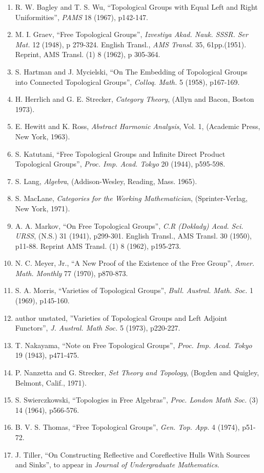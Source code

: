 \documentclass{article}
\begin{document}
\begin{enumerate}[1.]
  \item R. W. Bagley and T. S. Wu, ``Topological Groups with Equal Left and Right Uniformities'', \emph{PAMS} 18 (1967), p142-147.
  \item M. I. Graev, ``Free Topological Groups'', \emph{Izvestiya Akad. Nauk. SSSR. Ser Mat.} 12 (1948), p 279-324. English Transl., \emph{AMS Transl.} 35, 61pp.(1951). Reprint, AMS Transl. (1) 8 (1962), p 305-364.
  \item S. Hartman and J. Mycielski, ``On The Embedding of Topological Groups into Connected Topological Groups'', \emph{Colloq. Math.} 5 (1958), p167-169.
  \item H. Herrlich and G. E. Strecker, \emph{Category Theory}, (Allyn and Bacon, Boston 1973).
  \item E. Hewitt and K. Ross, \emph{Abstract Harmonic Analysis}, Vol. 1, (Academic Press, New York, 1963).
  \item S. Katutani, ``Free Topological Groups and Infinite Direct Product Topological Groups'', \emph{Proc. Imp. Acad. Tokyo} 20 (1944), p595-598.
  \item S. Lang, \emph{Algebra}, (Addison-Wesley, Reading, Mass. 1965).
  \item S. MacLane, \emph{Categories for the Working Mathematician}, (Sprinter-Verlag, New York, 1971).
  \item A. A. Markov, ``On Free Topological Groups'', \emph{C.R (Doklady) Acad. Sci. URSS}, (N.S.) 31 (1941), p299-301. English Transl., AMS Transl. 30 (1950), p11-88. Reprint AMS Transl. (1) 8 (1962), p195-273.
  \item N. C. Meyer, Jr., ``A New Proof of the Existence of the Free Group'', \emph{Amer. Math. Monthly} 77 (1970), p870-873.
  \item S. A. Morris, ``Varieties of Topological Groups'', \emph{Bull. Austral. Math. Soc.} 1 (1969), p145-160.
  \item author unstated, ''Varieties of Topological Groups and Left Adjoint Functors'', \emph{J. Austral. Math Soc.} 5 (1973), p220-227.
  \item T. Nakayama, ``Note on Free Topological Groups'', \emph{Proc. Imp. Acad. Tokyo} 19 (1943), p471-475.
  \item P. Nanzetta and G. Strecker, \emph{Set Theory and Topology}, (Bogden and Quigley, Belmont, Calif., 1971).
  \item S. Swierczkowski, ``Topologies in Free Algebras'', \emph{Proc. London Math Soc.} (3) 14 (1964), p566-576.
  \item B. V. S. Thomas, ``Free Topological Groups'', \emph{Gen. Top. App.} 4 (1974), p51-72.
  \item J. Tiller, ``On Constructing Reflective and Coreflective Hulls With Sources and Sinks'', to appear in \emph{Journal of Undergraduate Mathematics}.
\end{enumerate}
\end{document}
